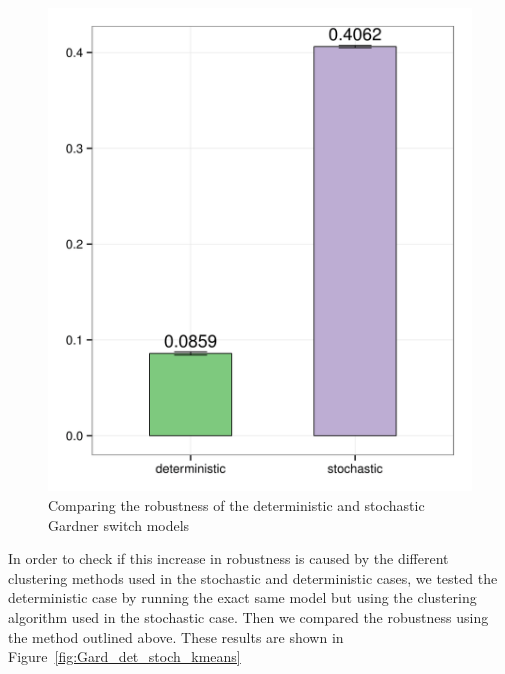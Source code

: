 \begin{figure}[h]
\centering
\includegraphics[scale=0.2]{chapterStabilityFinder/images/Gardner/robustness_comparison_det_stch.png}
\caption{Comparing the robustness of the deterministic and stochastic Gardner switch models}
\label{fig:Gard_robst}
\end{figure}



In order to check if this increase in robustness is caused by the different clustering methods used in the stochastic and deterministic cases, we tested the deterministic case by running the exact same model but using the clustering algorithm used in the stochastic case. Then we compared the robustness using the method outlined above. These results are shown in Figure~\ref{fig:Gard_det_stoch_kmeans}

